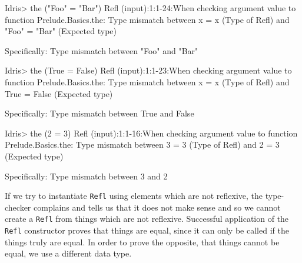         \begin{code}[label={des:not-refl}, caption={Things that are not reflexive}, escapeinside={(*}{*)}]
        Idris> the ("Foo" = "Bar") Refl
        (input):1:1-24:When checking argument value to function
        Prelude.Basics.the:
            Type mismatch between
                x = x (Type of Refl)
            and
                "Foo" = "Bar" (Expected type)
        
            Specifically:
                Type mismatch between
                    "Foo"
                and
                    "Bar"
        
        
        Idris> the (True = False) Refl
        (input):1:1-23:When checking argument value to function
        Prelude.Basics.the:
            Type mismatch between
                x = x (Type of Refl)
            and
                True = False (Expected type)
        
            Specifically:
                Type mismatch between
                    True
                and
                    False
        
        
        Idris> the (2 = 3) Refl
        (input):1:1-16:When checking argument value to function
        Prelude.Basics.the:
            Type mismatch between
                3 = 3 (Type of Refl)
            and
                2 = 3 (Expected type)
            
            Specifically:
                Type mismatch between
                    3
                and
                    2
        \end{code}
        If we try to instantiate \texttt{Refl} using elements which are not reflexive, the type-checker complains and tells us that it does not make sense and so we cannot create a \texttt{Refl} from things which are not reflexive. Successful application of the \texttt{Refl} constructor proves that things are equal, since it can only be called if the things truly are equal. In order to prove the opposite, that things cannot be equal, we use a different data type.
    
